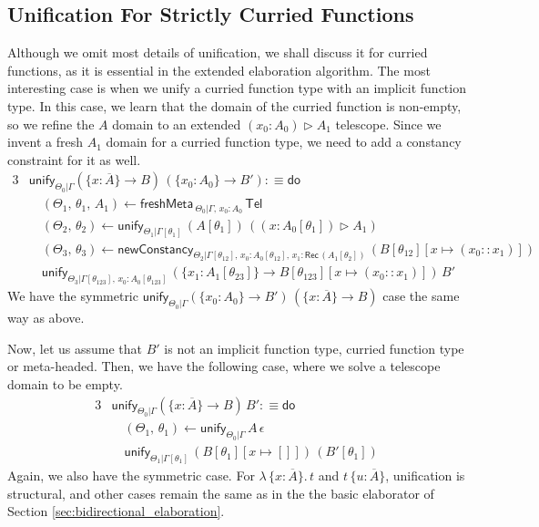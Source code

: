 \documentclass[acmsmall,review,anonymous,prologue,dvipsnames]{acmart}\settopmatter{printfolios=true,printccs=false,printacmref=false}
\newcommand{\freshMeta}[3]{\mathsf{freshMeta}\,_{#1|#2}\,#3}
\newcommand{\newConstancy}[5]{\mathsf{newConstancy}_{#1|#2,\,#3 : \Rec\,#4}\,#5}
\newcommand{\unify}{\mathsf{unify}}
\newcommand{\edo}{\boldsymbol{\mathsf{do}}}
\newcommand{\Tel}{\mathsf{Tel}}
\newcommand{\TCons}{\triangleright}
\newcommand{\Rec}{\mathsf{Rec}}
\newcommand{\ol}[1]{\overline{#1}}
\theoremstyle{remark}
\begin{document}
\subsection{Unification For Strictly Curried Functions}
Although we omit most details of unification, we shall discuss it for curried
functions, as it is essential in the extended elaboration algorithm.  The most
interesting case is when we unify a curried function type with an implicit
function type. In this case, we learn that the domain of the curried function is
non-empty, so we refine the $A$ domain to an extended $(x_0 : A_0) \TCons A_1$
telescope. Since we invent a fresh $A_1$ domain for a curried function type, we
need to add a constancy constraint for it as well.
\begin{alignat*}{3}
& \unify_{\Theta_0|\Gamma}(\{x : \ol{A}\}\to B)\,(\{x_0 : A_0\}\to B') :\equiv \edo\\
& \quad (\Theta_1,\,\theta_1,\,A_1) \leftarrow \freshMeta{\Theta_0}{\Gamma,\,x_0 : A_0}{\Tel}\\
& \quad (\Theta_2,\,\theta_2) \leftarrow
  \unify_{\Theta_1|\Gamma[\theta_1]}\,(A[\theta_1])\,((x : A_0[\theta_1])\TCons A_1)\\
& \quad (\Theta_3,\,\theta_3) \leftarrow
    \newConstancy{\Theta_2}{\Gamma[\theta_{12}],\,x_0 : A_0[\theta_{12}]}{x_1}{(A_1[\theta_2])}{(B[\theta_{12}][x\mapsto (x_0 :: x_1)])}\\
& \quad\unify_{\Theta_3|\Gamma[\theta_{123}],\,x_0 : A_0[\theta_{123}]}\,
         (\{x_1 : A_1[\theta_{23}]\}\to B[\theta_{123}][x\mapsto (x_0 :: x_1)])\,B'
\end{alignat*}
We have the symmetric $\unify_{\Theta_0|\Gamma}(\{x_0 : A_0\}\to B')\,(\{x :
\ol{A}\}\to B)$ case the same way as above.

Now, let us assume that $B'$ is not an implicit function type, curried function
type or meta-headed. Then, we have the following case, where we solve a
telescope domain to be empty.
\begin{alignat*}{3}
& \unify_{\Theta_0|\Gamma}(\{x : \ol{A}\}\to B)\,B' :\equiv \edo\\
& \quad (\Theta_1,\,\theta_1) \leftarrow \unify_{\Theta_0|\Gamma}\,A\,\epsilon\\
& \quad \unify_{\Theta_1|\Gamma[\theta_1]}\,(B[\theta_1][x\mapsto[]])\,(B'[\theta_1])
\end{alignat*}
Again, we also have the symmetric case. For $\lambda\,\{x : \ol{A}\}.\,t$ and
$t\,\{u : \ol{A}\}$, unification is structural, and other cases remain the same
as in the the basic elaborator of Section \ref{sec:bidirectional_elaboration}.
\end{document}
